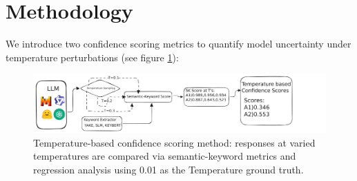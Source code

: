 \documentclass[sigconf]{acmart}
\begin{document}
\section{Methodology}

We introduce two confidence scoring metrics to quantify model uncertainty under temperature perturbations (see figure \ref{fig:main_approach}):


\begin{figure}[ht]
    \centering
    \includegraphics[width=\columnwidth]{images/Main-approach.pdf}
    \caption{Temperature-based confidence scoring method: responses at varied temperatures are compared via semantic-keyword metrics and regression analysis using 0.01 as the Temperature ground truth.}
    \label{fig:main_approach}
\end{figure}
\end{document}
